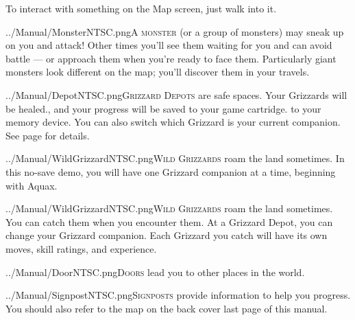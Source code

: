 \documentclass[10pt,twocolumn,openany,article]{memoir}
\begin{document}
To interact with something on the Map screen, just walk into it.

\lettrine[image=true,                lines=5,               findent=3pt,
nindent=3pt]{../Manual/MonsterNTSC.png}{A   monster}  (or   a  group   of
monsters) may  sneak up on you  and attack! Other times  you'll see them
waiting for  you and can avoid  battle --- or approach  them when you're
ready to  face them. Particularly  giant monsters look different  on the
map; you'll discover them in your travels.

\lettrine[image=true,                lines=5,               findent=3pt,
nindent=3pt]{../Manual/DepotNTSC.png}{Grizzard  Depots} are  safe spaces.
Your  Grizzards will  be  healed\ifdefined\NOSAVE{}.{}\else{}, and  your
progress will  be saved \ifdefined\ATARIAGESAVE to  your game cartridge.
\else to your  memory device. \fi You can also  switch which Grizzard is
your  current   companion.  \fi  See   page  \pageref{sec:GrizzardDepot}
for details.

\ifdefined\ATARIAGESAVE\pagebreak\fi

\ifdefined\NOSAVE

\lettrine[image=true,                lines=5,               findent=3pt,
nindent=3pt]{../Manual/WildGrizzardNTSC.png}{Wild  Grizzards}   roam  the
land  sometimes.  In this  no-save  demo,  you  will have  one  Grizzard
companion at a time, beginning with Aquax.

\else

\lettrine[image=true,                lines=5,               findent=3pt,
nindent=3pt]{../Manual/WildGrizzardNTSC.png}{Wild  Grizzards}   roam  the
land  sometimes.   You  can   catch  them   when  you   encounter  them.
At  a   Grizzard  Depot,  you   can  change  your   Grizzard  companion.
Each  Grizzard  you  catch  will  have its  own  moves,  skill  ratings,
and experience.

\fi

\lettrine[image=true,                lines=5,               findent=3pt,
nindent=3pt]{../Manual/DoorNTSC.png}{Doors} lead  you to other  places in
the world.

\vspace{30pt}

\lettrine[image=true,                lines=5,               findent=3pt,
nindent=3pt]{../Manual/SignpostNTSC.png}{Signposts}  provide  information
to  help  you  progress.  You  should  also refer  to  the  map  on  the
\ifdefined\ATARIAGESAVE back cover \else last page \fi{} of this manual.
\end{document}
